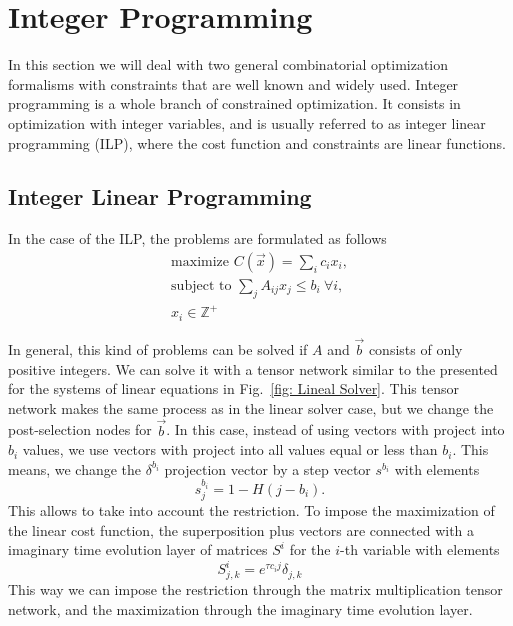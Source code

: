\section{Integer Programming}
In this section we will deal with two general combinatorial optimization formalisms with constraints that are well known and widely used. Integer programming is a whole branch of constrained optimization. It consists in optimization with integer variables, and is usually referred to as integer linear programming (ILP), where the cost function and constraints are linear functions.


\subsection{Integer Linear Programming}
In the case of the ILP, the problems are formulated as follows
\begin{equation}
    \begin{gathered}
        \text{maximize }C(\vec{x}) = \sum_i c_i x_i,\\
        \text{subject to } \sum_{j} A_{ij}  x_j \leq b_i \ \forall i,\\
        x_i \in \mathbb{Z}^+
    \end{gathered}
\end{equation}

In general, this kind of problems can be solved if $A$ and $\vec{b}$ consists of only positive integers. We can solve it with a tensor network similar to the presented for the systems of linear equations in Fig.~\ref{fig: Lineal Solver}. This tensor network makes the same process as in the linear solver case, but we change the post-selection nodes for $\vec{b}$. In this case, instead of using vectors with project into $b_i$ values, we use vectors with project into all values equal or less than $b_i$. This means, we change the $\delta^{b_i}$ projection vector by a step vector $s^{b_i}$ with elements
\begin{equation}
    s^{b_i}_j = 1 - H(j-b_i).
\end{equation}
This allows to take into account the restriction. To impose the maximization of the linear cost function, the superposition plus vectors are connected with a imaginary time evolution layer of matrices $S^i$ for the $i$-th variable with elements
\begin{equation}
    S^i_{j,k} = e^{\tau c_i j}\delta_{j,k}
\end{equation}
This way we can impose the restriction through the matrix multiplication tensor network, and the maximization through the imaginary time evolution layer.

